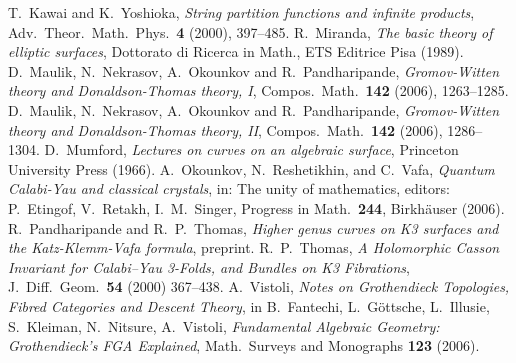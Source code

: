 \documentclass{amsart}
\theoremstyle{definition}
\begin{document}
\begin{thebibliography}{MNOP2}
 T.~Kawai and K.~Yoshioka, \emph{String partition functions and infinite products}, Adv.~Theor.~Math.~Phys.~\textbf{4} (2000), 397--485.
 R.~Miranda, \textit{The basic theory of elliptic surfaces}, Dottorato di Ricerca in Math., ETS Editrice Pisa (1989).
 D.~Maulik, N.~Nekrasov, A.~Okounkov and R.~Pandharipande, \textit{Gromov-{W}itten theory and {D}onaldson-{T}homas theory, {I}}, Compos.~Math.~\textbf{142} (2006), 1263--1285. %
 D.~Maulik, N.~Nekrasov, A.~Okounkov and R.~Pandharipande, \textit{Gromov-{W}itten theory and {D}onaldson-{T}homas theory, {II}}, Compos.~Math.~\textbf{142} (2006), 1286--1304. 
 D.~Mumford, \textit{Lectures on curves on an algebraic surface}, Princeton University Press (1966).
 A.~Okounkov, N.~Reshetikhin, and C.~Vafa, \textit{Quantum Calabi-Yau and classical crystals}, in: The unity of mathematics, editors: P.~Etingof, V.~Retakh, I.~M.~Singer, Progress in Math.~\textbf{244}, Birkh\"auser (2006).
 R.~Pandharipande and R.~P.~Thomas, \textit{Higher genus curves on K3 surfaces and the Katz-Klemm-Vafa formula}, preprint.
 R.~P.~Thomas, \textit{A Holomorphic Casson Invariant for Calabi--Yau 3-Folds, and Bundles on K3 Fibrations}, J.~Diff.~Geom.~\textbf{54} (2000) 367--438.
 A.~Vistoli, \textit{Notes on Grothendieck Topologies, Fibred Categories and Descent Theory}, in B.~Fantechi, L.~G\"ottsche, L.~Illusie, S.~Kleiman, N.~Nitsure, A.~Vistoli, \textit{Fundamental Algebraic Geometry: Grothendieck's FGA Explained}, Math.~Surveys and Monographs \textbf{123} (2006).
\end{thebibliography}
\end{document}
